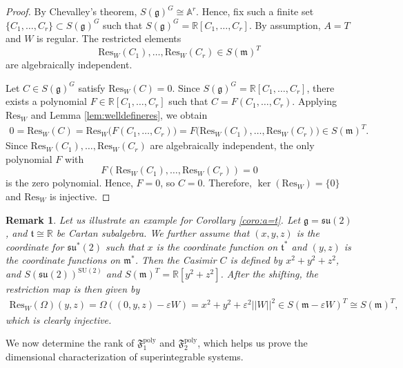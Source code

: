 \documentclass[11pt]{amsart}
\theoremstyle{definition}
\theoremstyle{plain}
\newtheorem{remark}[theorem]{Remark}
\theoremstyle{conclusion}
\begin{document}
\begin{proof}
  By Chevalley's theorem, $S(\mathfrak{g})^G \cong \mathbb{A}^r$. Hence, fix such a finite set $\{C_1,\dots,C_r\}\subset S(\mathfrak{g})^G$ such that $S(\mathfrak{g})^G=\mathbb{R}[C_1,\dots,C_r]$. By assumption, $A=T$ and $W$ is regular. The restricted elements $$\mathrm{Res}_W(C_1), \dots, \mathrm{Res}_W(C_r) \in S(\mathfrak{m})^T$$ are algebraically independent.

Let $C\in S(\mathfrak{g})^G$ satisfy $\mathrm{Res}_W(C)=0$. Since $S(\mathfrak{g})^G = \mathbb{R}[C_1,\dots,C_r]$, there exists a polynomial $F\in \mathbb{R}[C_1,\dots,C_r]$ such that $C=F(C_1,\dots,C_r)$. Applying $\mathrm{Res}_W$ and Lemma \ref{lem:welldefineres}, we obtain \begin{align}
   0=\mathrm{Res}_W(C) =\mathrm{Res}_W \bigl(F(C_1,\dots,C_r)\bigr) =F\bigl(\mathrm{Res}_W(C_1),\dots,\mathrm{Res}_W(C_r)\bigr) \in S(\mathfrak{m})^T. 
\end{align} Since $\mathrm{Res}_W(C_1),\dots,\mathrm{Res}_W(C_r)$ are algebraically independent, the only polynomial $F$ with $$F(\mathrm{Res}_W(C_1),\dots,\mathrm{Res}_W(C_r))=0$$ is the zero polynomial. Hence, $F=0$, so $C=0$. Therefore, $\ker(\mathrm{Res}_W)=\{0\}$ and $\mathrm{Res}_W$ is injective.
\end{proof}
\begin{remark}
  Let us illustrate an example for Corollary \ref{coro:a=t}. Let $\mathfrak{g} = \mathfrak{su}(2)$, and $\mathfrak{t} \cong \mathbb{R}$ be Cartan subalgebra. We further assume that $(x,y,z)$ is the coordinate for $\mathfrak{su}^*(2) $ such that $ x$ is the coordinate function on $\mathfrak{t}^*$ and $(y,z)$ is the coordinate functions on $\mathfrak{m}^*$. Then the Casimir $C$ is defined by $x^2 + y^2 + z^2$, and $S(\mathfrak{su}(2))^{\mathrm{SU}(2)}$ and $S(\mathfrak{m})^T = \mathbb{R}[y^2 + z^2]$.  After the shifting, the restriction map is then given by \begin{align*}
        \mathrm{Res}_W (\Omega) (y,z) = \Omega((0,y,z) - \varepsilon W ) = x^2 + y^2 + \varepsilon^2||W||^2 \in S(\mathfrak{m} - \varepsilon W)^T \cong S(\mathfrak{m})^T,
    \end{align*} which is clearly injective.
\end{remark}

We now determine the rank of $\mathfrak{F}_1^{\mathrm{poly}}$ and $\mathfrak{F}_2^{\mathrm{poly}}$, which helps us prove the dimensional characterization of superintegrable systems.
\end{document}
